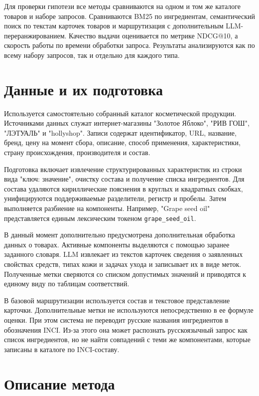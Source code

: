 \documentclass{misisarticle}
\begin{document}
Для проверки гипотези все методы сравниваются на одном и том же каталоге товаров и наборе запросов. Сравниваются BM25 по ингредиентам, семантический поиск по текстам карточек товаров и маршрутизация с дополнительным LLM-переранжированием. Качество выдачи оценивается по метрике NDCG@10, а скорость работы по времени обработки запроса. Результаты анализируются как по всему набору запросов, так и отдельно для каждого типа.

\section{Данные и их подготовка}

Используется самостоятельно собранный каталог косметической продукции. Источниками данных служат интернет-магазины "Золотое Яблоко", "РИВ ГОШ", "ЛЭТУАЛЬ" и "hollyshop". Записи содержат идентификатор, URL, название, бренд, цену на момент сбора, описание, способ применения, характеристики, страну происхождения, производителя и состав.

Подготовка включает извлечение структурированных характеристик из строки вида "ключ: значение", очистку состава и получение списка ингредиентов. Для состава удаляются кириллические пояснения в круглых и квадратных скобках, унифицируются поддерживаемые разделители, регистр и пробелы. Затем выполняется разбиение на компоненты. Например, "Grape seed oil" представляется единым лексическим токеном \texttt{grape\_seed\_oil}.

В данный момент дополнительно предусмотрена дополнительная обработка данных о товарах. Активные компоненты выделяются с помощью заранее заданного словаря. LLM извлекает из текстов карточек сведения о заявленных свойствах средств, типах кожи и задачах ухода и записывает их в виде меток. Полученные метки сверяются со списком допустимых значений и приводятся к единому виду по таблицам соответствий. 

В базовой маршрутизации используется состав и текстовое представление карточки. Дополнительные метки не используются непосредственно в ее формуле оценки. При этом система не переводит русские названия ингредиентов в обозначения INCI. Из-за этого она может распознать русскоязычный запрос как список ингредиентов, но не найти совпадений с теми же компонентами, которые записаны в каталоге по INCI-составу.

\section{Описание метода}
\end{document}
